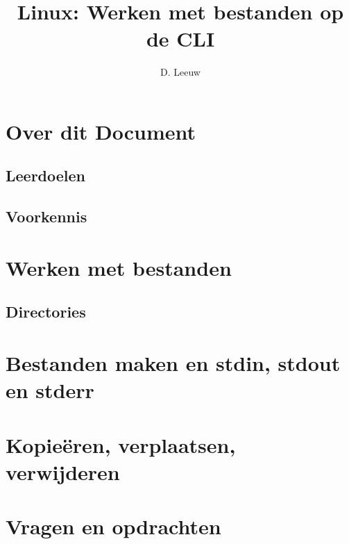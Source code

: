 \documentclass[a4paper,12pt,twoside,openright,titlepage]{article}
\author{D. Leeuw}
\title{Linux: Werken met bestanden op de CLI}
\date{\today\\
1.0.0\\
\vfill
\raggedright
\copyright\ 2020-2025 Dennis Leeuw\\
}
\begin{document}

\maketitle


\section{Over dit Document}
\subsection{Leerdoelen}

\subsection{Voorkennis}



\section{Werken met bestanden}

\subsection{Directories}


\section{Bestanden maken en stdin, stdout en stderr}

\section{Kopie\"eren, verplaatsen, verwijderen}

\section{Vragen en opdrachten}


\printindex
\end{document}
